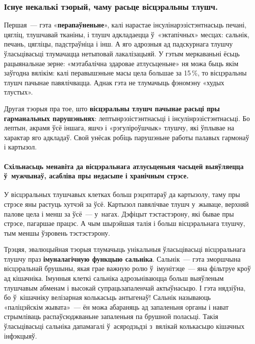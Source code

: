 \subsubsection{Існуе некалькі тэорый, чаму расьце вісцэральны тлушч.}
Першая~--- гэта «\textbf{перапаўненьне}», калі нарастае інсулінарэзістэнтнасьць печані, цягліц, тлушчавай тканіны, і тлушч адкладаецца ў~«эктапічных» месцах: сальнік, печань, цягліцы, падстраўніца і інш. А яго адрозныя ад падскурнага тлушчу ўласьцівасьці тлумачацца нетыповай лакалізацыяй. У гэтым меркаваньні ёсьць рацыянальнае зерне: «мэтабалічна здаровае атлусьценьне» ня можа быць якім заўгодна вялікім: калі перавышэньне масы цела большае за 15\,\%, то вісцэральны тлушч пачынае павялічвацца. Аднак гэта не тлумачыць фэномэну «худых тлустых».

Другая тэорыя пра тое, што \textbf{вісцэральны тлушч пачынае расьці пры гарманальных парушэньнях}: лептынрэзістэнтнасьці і інсулінрэзістэнтнасьці. Бо лептын, акрамя ўсё іншага, яшчэ і «рэгуліроўшчык» тлушчу, які ўплывае на характар яго адкладаў. Свой унёсак робіць парушэньне работы палавых гармонаў і картызол.

\paragraph{Схільнасьць менавіта да вісцэральнага атлусьценьня часьцей выяўляецца ў~мужчынаў, асабліва пры недасыпе і хранічным стрэсе.} У вісцэральных тлушчавых клетках больш рэцэптараў да картызолу, таму пры стрэсе яны растуць хутчэй за ўсё. Картызол павялічвае тлушч у~жываце, верхняй палове цела і менш за ўсё~--- у~нагах. Дэфіцыт тэстастэрону, які бывае пры стрэсе, пагаршае працэс. А чым шырэйшая талія і больш вісцэральнага тлушчу, тым меншы ўзровень тэстэстэрону.

Трэцяя, эвалюцыйная тэорыя тлумачыць унікальныя ўласьцівасьці вісцэральнага тлушчу праз \textbf{імуналагічную функцыю сальніка}. Сальнік~--- гэта зморшчына вісцэральнай брушыны, якая грае важную ролю ў~імунітэце~--- яна фільтруе кроў ад кішачніка. Імунныя клеткі сальніка адрозьніваюцца больш выяўленым тлушчавым абменам і высокай супрацьзапаленчай актыўнасьцю. І гэта нядзіўна, бо ў~кішачніку велізарная колькасьць антыгенаў! Сальнік называюць «паліцэйскім жывата»~--- ён можа абараняць ад запаленьня органы і нават стрымліваць распаўсюджваньне запаленьня па брушной поласьці. Такія ўласьцівасьці сальніка дапамагалі ў~асяродзьдзі з~вялікай колькасьцю кішачных інфэкцыяў.

